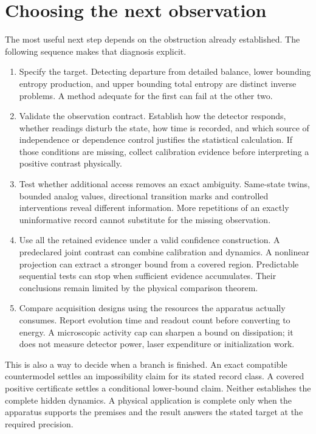\section{Choosing the next observation}
The most useful next step depends on the obstruction already established.
The following sequence makes that diagnosis explicit.
\begin{enumerate}
\item Specify the target. Detecting departure from detailed balance, lower
bounding entropy production, and upper bounding total entropy are distinct
inverse problems. A method adequate for the first can fail at the other two.
\item Validate the observation contract. Establish how the detector responds,
whether readings disturb the state, how time is recorded, and which source
of independence or dependence control justifies the statistical calculation.
If those conditions are missing, collect calibration evidence before
interpreting a positive contrast physically.
\item Test whether additional access removes an exact ambiguity. Same-state
twins, bounded analog values, directional transition marks and controlled
interventions reveal different information. More repetitions of an exactly
uninformative record cannot substitute for the missing observation.
\item Use all the retained evidence under a valid confidence construction.
A predeclared joint contrast can combine calibration and dynamics. A
nonlinear projection can extract a stronger bound from a covered region.
Predictable sequential tests can stop when sufficient evidence accumulates.
Their conclusions remain limited by the physical comparison theorem.
\item Compare acquisition designs using the resources the apparatus actually
consumes. Report evolution time and readout count before converting to
energy. A microscopic activity cap can sharpen a bound on dissipation; it
does not measure detector power, laser expenditure or initialization work.
\end{enumerate}

This is also a way to decide when a branch is finished. An exact compatible
countermodel settles an impossibility claim for its stated record class.
A covered positive certificate settles a conditional lower-bound claim.
Neither establishes the complete hidden dynamics. A physical application is
complete only when the apparatus supports the premises and the result answers
the stated target at the required precision.

